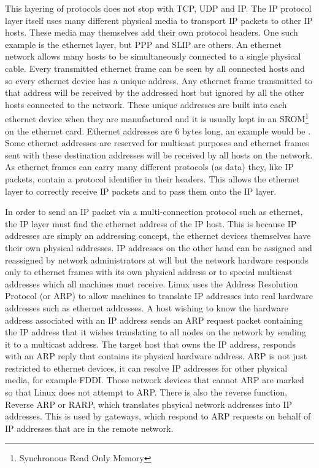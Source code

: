 This layering of protocols does not stop with TCP, UDP and IP.
The IP protocol layer itself uses many different physical media to transport IP packets to other
IP hosts.
These media may themselves add their own protocol headers.
One such example is the ethernet layer, but PPP and SLIP are others.
An ethernet network allows many hosts to be simultaneously connected to a single physical
cable.
Every transmitted ethernet frame can be seen by all connected hosts and so every ethernet
device has a unique address.
Any ethernet frame transmitted to that address will be received by the addressed host but
ignored by all the other hosts connected to the network.
These unique addresses are built into each ethernet device when they are manufactured and it
is usually kept in an SROM\footnote{Synchronous Read Only Memory} on the ethernet card.
Ethernet addresses are 6 bytes long, an example would be .
Some ethernet addresses are reserved for multicast purposes and ethernet frames sent with
these destination addresses will be received by all hosts on the network.
As ethernet frames can carry many different protocols (as data) they, like IP packets, 
contain a protocol identifier in their headers.
This allows the ethernet layer to correctly receive IP packets and to pass them onto the
IP layer.

In order to send an IP packet via a multi-connection protocol such as ethernet, the IP layer 
must find the ethernet address of the IP host.
This is because IP addresses are simply an addressing concept, the ethernet devices themselves
have their own physical addresses.
IP addresses on the other hand can be assigned and reassigned by network administrators at will 
but the network hardware responds only to ethernet frames with its own physical address or to special
multicast addresses which all machines must receive.
Linux uses the Address Resolution Protocol (or ARP) to allow machines to translate
IP addresses into real hardware addresses such as ethernet addresses.
A host wishing to know the hardware address associated with an IP address sends an ARP request packet
containing the IP address that it wishes translating to all nodes on the network by sending it to
a multicast address.
The target host that owns the IP address, responds with an ARP reply that contains its physical
hardware address.
ARP is not just restricted to ethernet devices, it can resolve IP addresses for other physical
media, for example FDDI.
Those network devices that cannot ARP are marked so that Linux does not attempt to ARP.
There is also the reverse function, Reverse ARP or RARP, which translates phsyical network
addresses into IP addresses.
This is used by gateways, which respond to ARP requests on behalf of IP addresses that are in the
remote network.

